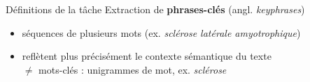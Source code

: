 \begin{frame}{Définitions de la tâche}
\centering
Extraction de \og{}\textbf{phrases-clés}\fg{} (angl. \textit{keyphrases})  \pause
\begin{itemize}[<+->]
\item séquences de plusieurs mots (ex. \textit{sclérose latérale amyotrophique})
\item reflètent plus précisément le contexte sémantique du texte \\\small{$\neq$ mots-clés : unigrammes de mot, ex. \textit{sclérose}}
\end{itemize}
\pause
\bigskip
\begin{columns}[t,onlytextwidth]
\justifying
{}
\begin{flushright}
\small{\citep{schopf2022}}
\end{flushright} 
\begin{flushright}
\small{\citep{xie2023}}
\end{flushright}
\end{columns}
\end{frame}

